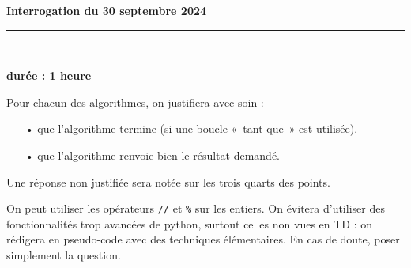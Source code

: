 \documentclass[11pt,a4paper]{article}
\title{}
\date{}
\newcommand{\HRule}{\rule{\linewidth}{0.5mm}}
\begin{document}
\pagestyle{fancy}

\fancyhead{}
 \fancyfoot{}


\newcommand{\lb}{\llbracket}
\newcommand{\rb}{\rrbracket}
\newcommand{\N}{\mathbb{N}}
\newcommand{\Z}{\mathbb{Z}}
\newcommand{\R}{\mathbb{R}}




\newcommand{\md}[3]{#1\ \equiv \ #2 \! \! \! \! \! \pmod {#3} }
\newcommand{\nmd}[3]{#1 \not \equiv #2 \! \! \! \! \!  \pmod {#3} }
\newcommand{\mda}[3]{#1 \equiv #2 \! \!  \pmod {#3} }
\newcommand{\nmda}[3]{#1 \not \equiv #2 \! \! \pmod {#3} }
\newcommand{\mo}[2]{#1 \! \! \! \! \! \pmod #2 }
\newcommand{\moa}[2]{#1 \! \!  \pmod {#2} }

\thispagestyle{fancy}

\begin{center}
    { \huge \bfseries
Interrogation du 30 septembre 2024
     \\ [0cm] }
    \HRule \\[0.5cm]
\end{center}

\begin{center}
\textbf{durée : 1 heure}
\end{center}



Pour chacun des algorithmes, on justifiera avec soin : \begin{itemize}
\item[•] que l'algorithme termine (si une boucle «~tant que~» est utilisée).

\item[•] que l'algorithme renvoie bien le résultat demandé.
\end{itemize}

Une réponse non justifiée sera notée sur les trois quarts des points.

On peut utiliser les opérateurs \verb+//+ et \verb+%+ sur les entiers. On évitera d'utiliser des fonctionnalités trop avancées de python, surtout celles non vues en TD : on rédigera en pseudo-code avec des techniques élémentaires. En cas de doute, poser simplement la question.
\end{document}
